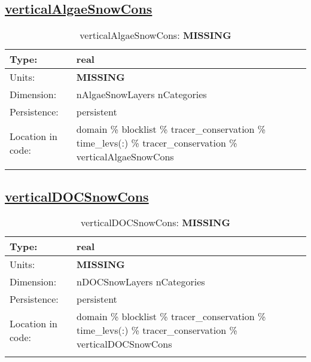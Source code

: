 \subsection[verticalAlgaeSnowCons]{\hyperref[sec:var_tab_tracer_conservation]{verticalAlgaeSnowCons}}
\label{subsec:var_sec_tracer_conservation_verticalAlgaeSnowCons}
\begin{center}
\begin{longtable}{| p{2.0in} | p{4.0in} |}
        \hline 
        Type: & real \\
        \hline 
        Units: & {\bf \color{red} MISSING} \\
        \hline 
        Dimension: & nAlgaeSnowLayers nCategories \\
        \hline 
        Persistence: & persistent \\
        \hline 
         Location in code: & domain \% blocklist \% tracer\_conservation \% time\_levs(:) \% tracer\_conservation \% verticalAlgaeSnowCons \\
         \hline 
    \caption{verticalAlgaeSnowCons: {\bf \color{red} MISSING}}
\end{longtable}
\end{center}
\subsection[verticalDOCSnowCons]{\hyperref[sec:var_tab_tracer_conservation]{verticalDOCSnowCons}}
\label{subsec:var_sec_tracer_conservation_verticalDOCSnowCons}
\begin{center}
\begin{longtable}{| p{2.0in} | p{4.0in} |}
        \hline 
        Type: & real \\
        \hline 
        Units: & {\bf \color{red} MISSING} \\
        \hline 
        Dimension: & nDOCSnowLayers nCategories \\
        \hline 
        Persistence: & persistent \\
        \hline 
         Location in code: & domain \% blocklist \% tracer\_conservation \% time\_levs(:) \% tracer\_conservation \% verticalDOCSnowCons \\
         \hline 
    \caption{verticalDOCSnowCons: {\bf \color{red} MISSING}}
\end{longtable}
\end{center}
